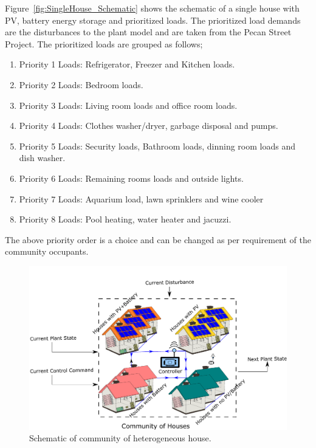 \documentclass[11pt,usenames]{article}
\begin{document}
Figure~\ref{fig:SingleHouse_Schematic} shows the schematic of a single house with PV, battery energy storage and prioritized loads. The prioritized load demands are the disturbances to the plant model and are taken from the Pecan Street Project. The prioritized loads are grouped as follows;

\begin{enumerate}
	\item Priority 1 Loads: Refrigerator, Freezer and Kitchen loads.
	\item Priority 2 Loads: Bedroom loads.
	\item Priority 3 Loads: Living room loads and office room loads.
	\item Priority 4 Loads: Clothes washer/dryer, garbage disposal and pumps.
	\item Priority 5 Loads: Security loads, Bathroom loads, dinning room loads and dish washer.
	\item Priority 6 Loads: Remaining rooms loads and outside lights.
	\item Priority 7 Loads: Aquarium load, lawn sprinklers and wine cooler
	\item Priority 8 Loads: Pool heating, water heater and jacuzzi.
\end{enumerate}

The above priority order is a choice and can be changed as per requirement of the community occupants.

\begin{figure}[htpb]
	\centering
	\includegraphics[scale=0.8]{CommunityHouses_Schematic.pdf}
	\caption{Schematic of community of heterogeneous house.}
	\label{fig:Community_Schematic}
\end{figure}
\end{document}
